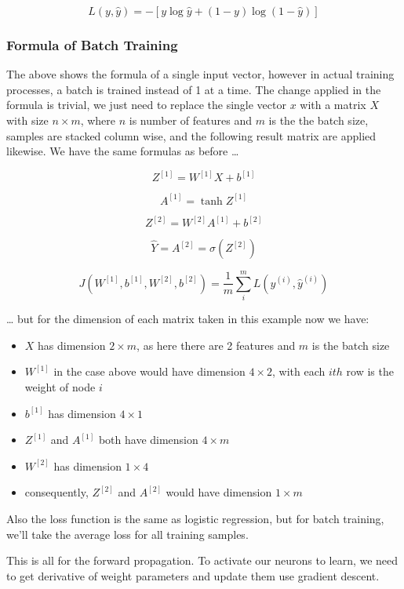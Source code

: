 \documentclass[11pt]{article}
\providecommand{\tightlist}{%
      \setlength{\itemsep}{0pt}\setlength{\parskip}{0pt}}
\begin{document}
\[ L(y, \hat{y}) = -[y\log{\hat{y}} + (1 - y)\log{(1 - \hat{y})}] \]

    \hypertarget{formula-of-batch-training}{%
\subsubsection{Formula of Batch
Training}\label{formula-of-batch-training}}

The above shows the formula of a single input vector, however in actual
training processes, a batch is trained instead of 1 at a time. The
change applied in the formula is trivial, we just need to replace the
single vector \(x\) with a matrix \(X\) with size \(n \times m\), where
\(n\) is number of features and \(m\) is the the batch size, samples are
stacked column wise, and the following result matrix are applied
likewise. We have the same formulas as before \ldots{}

\[ Z^{[1]} = W^{[1]}X + b^{[1]}  \]

\[ A^{[1]} = \tanh{Z^{[1]}}  \]

\[ Z^{[2]} = W^{[2]}A^{[1]} + b^{[2]}  \]

\[ \hat{Y} = A^{[2]} = \sigma({Z^{[2]}})  \]

\[ J(W^{[1]}, b^{[1]}, W^{[2]}, b^{[2]}) = \frac{1}{m} \sum_{i}^{m}L(y^{(i)}, \hat{y}^{(i)})  \]

\ldots{} but for the dimension of each matrix taken in this example now
we have:

\begin{itemize}
\tightlist
\item
  \(X\) has dimension \(2 \times m\), as here there are 2 features and
  \(m\) is the batch size
\item
  \(W^{[1]}\) in the case above would have dimension \(4 \times 2\),
  with each \(ith\) row is the weight of node \(i\)
\item
  \(b^{[1]}\) has dimension \(4 \times 1\)
\item
  \(Z^{[1]}\) and \(A^{[1]}\) both have dimension \(4 \times m\)
\item
  \(W^{[2]}\) has dimension \(1 \times 4\)
\item
  consequently, \(Z^{[2]}\) and \(A^{[2]}\) would have dimension
  \(1 \times m\)
\end{itemize}

Also the loss function is the same as logistic regression, but for batch
training, we'll take the average loss for all training samples.

This is all for the forward propagation. To activate our neurons to
learn, we need to get derivative of weight parameters and update them
use gradient descent.
\end{document}
